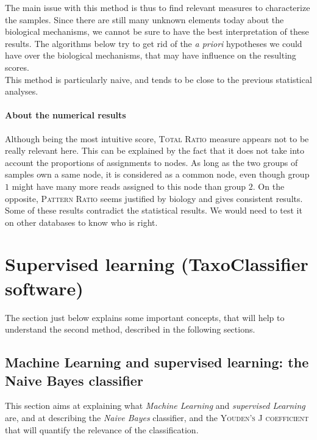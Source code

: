 \documentclass{report}
\begin{document}
The main issue with this method is thus to find relevant measures to characterize the samples. Since there are still many unknown elements today about the biological mechanisms, we cannot be sure to have the best interpretation of these results. The algorithms below try to get rid of the \emph{a priori} hypotheses we could have over the biological mechanisms, that may have influence on the resulting scores.\\

This method is particularly naive, and tends to be close to the previous statistical analyses.\\

\subsubsection{About the numerical results}

Although being the most intuitive score, \textsc{Total Ratio} measure appears not to be really relevant here. This can be explained by the fact that it does not take into account the proportions of assignments to nodes. As long as the two groups of samples own a same node, it is considered as a common node, even though group $1$ might have many more reads assigned to this node than group $2$. On the opposite, \textsc{Pattern Ratio} seems justified by biology and gives consistent results.\\

Some of these results contradict the statistical results. We would need to test it on other databases to know who is right.\\

\chapter{Supervised learning (TaxoClassifier software)}

The section just below explains some important concepts, that will help to understand the second method, described in the following sections. 

\section{Machine Learning and supervised learning: the Naive Bayes classifier}

This section aims at explaining what \emph{Machine Learning} and \emph{supervised Learning} are, and at describing the \emph{Naive Bayes} classifier, and the \textsc{Youden's J coefficient} that will quantify the relevance of the classification.
\end{document}
